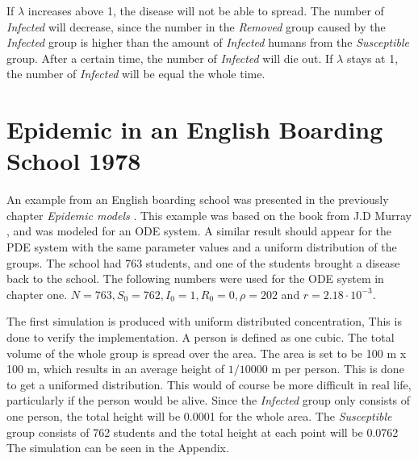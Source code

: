 \documentclass[%
twoside,                 %
final,                   %
10pt]{article}
\begin{document}
\vspace{3mm}




\vspace{3mm}


If $\lambda$ increases above 1, the disease will not be able to spread. The number of \emph{Infected} will decrease, since the number in the \emph{Removed} group caused by the \emph{Infected} group is higher than the amount of \emph{Infected} humans from the \emph{Susceptible} group. After a certain time, the number of \emph{Infected} will die out. If $\lambda$ stays at 1, the number of \emph{Infected} will be equal the whole time. 

\section{Epidemic in an English Boarding School 1978}
An example from an English boarding school was presented in the previously chapter \emph{Epidemic models} . This example was based on the book from J.D Murray \cite{murray2002mathematical}, and was modeled for an ODE system. A similar result should appear for the PDE system with the same parameter values and a uniform distribution of the groups. The school had 763 students, and one of the students brought a disease back to the school. The following numbers were used for the ODE system in chapter one. $N=763, S_0=762,I_0=1,R_0=0,\rho=202$ and $r = 2.18\cdot 10^{-3}$. 


\vspace{3mm}




\vspace{3mm}


The first simulation is produced with uniform distributed concentration, This is done to verify the implementation. A person is defined as one cubic. The total volume of the whole group is spread over the area. The area is set to be 100 m x 100 m, which results in an average height of $1/10000$ m per person. This is done to get a uniformed distribution. This would of course be more difficult in real life, particularly if the person would be alive. Since the \emph{Infected} group only consists of one person, the total height will be 0.0001 for the whole area. The \emph{Susceptible} group consists of 762 students and the total height at each point will be 0.0762 The simulation can be seen in the Appendix. 


\vspace{3mm}
\end{document}
